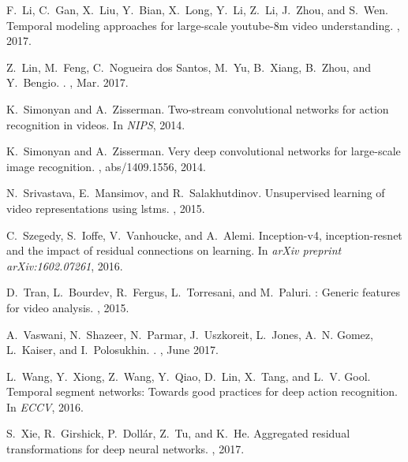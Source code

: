 \documentclass[10pt,twocolumn,letterpaper]{article}
\begin{document}
\begin{thebibliography}{10}
F.~Li, C.~Gan, X.~Liu, Y.~Bian, X.~Long, Y.~Li, Z.~Li, J.~Zhou, and S.~Wen.
\newblock Temporal modeling approaches for large-scale youtube-8m video
  understanding.
, 2017.

Z.~{Lin}, M.~{Feng}, C.~{Nogueira dos Santos}, M.~{Yu}, B.~{Xiang}, B.~{Zhou},
  and Y.~{Bengio}.
.
, Mar. 2017.

K.~Simonyan and A.~Zisserman.
\newblock Two-stream convolutional networks for action recognition in videos.
\newblock In {\em NIPS}, 2014.

K.~Simonyan and A.~Zisserman.
\newblock Very deep convolutional networks for large-scale image recognition.
, abs/1409.1556, 2014.

N.~Srivastava, E.~Mansimov, and R.~Salakhutdinov.
\newblock Unsupervised learning of video representations using lstms.
, 2015.

C.~Szegedy, S.~Ioffe, V.~Vanhoucke, and A.~Alemi.
\newblock Inception-v4, inception-resnet and the impact of residual connections
  on learning.
\newblock In {\em arXiv preprint arXiv:1602.07261}, 2016.

D.~Tran, L.~Bourdev, R.~Fergus, L.~Torresani, and M.~Paluri.
: Generic features for video analysis.
, 2015.

A.~{Vaswani}, N.~{Shazeer}, N.~{Parmar}, J.~{Uszkoreit}, L.~{Jones}, A.~N.
  {Gomez}, L.~{Kaiser}, and I.~{Polosukhin}.
.
, June 2017.

L.~Wang, Y.~Xiong, Z.~Wang, Y.~Qiao, D.~Lin, X.~Tang, and L.~V. Gool.
\newblock Temporal segment networks: Towards good practices for deep action
  recognition.
\newblock In {\em ECCV}, 2016.

S.~Xie, R.~Girshick, P.~Doll{\'a}r, Z.~Tu, and K.~He.
\newblock Aggregated residual transformations for deep neural networks.
, 2017.

\end{thebibliography}
\end{document}
